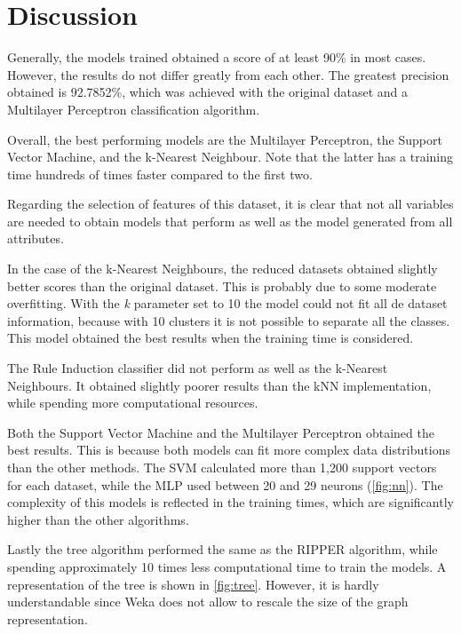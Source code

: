 \documentclass[a4paper,11pt]{article}
\begin{document}
\section{Discussion}
\label{sec:discussion}

Generally, the models trained obtained a score of at least 90\% in most cases. However, the results do not differ greatly from each other. The greatest precision obtained is 92.7852\%, which was achieved with the original dataset and a Multilayer Perceptron classification algorithm.

Overall, the best performing models are the Multilayer Perceptron, the Support Vector Machine, and the k-Nearest Neighbour. Note that the latter has a training time hundreds of times faster compared to the first two.

Regarding the selection of features of this dataset, it is clear that not all variables are needed to obtain models that perform as well as the model generated from all attributes.

In the case of the k-Nearest Neighbours, the reduced datasets obtained slightly better scores than the original dataset. This is probably due to some moderate overfitting. With the \textit{k} parameter set to 10 the model could not fit all de dataset information, because with 10 clusters it is not possible to separate all the classes. This model obtained the best results when the training time is considered.

The Rule Induction classifier did not perform as well as the k-Nearest Neighbours. It obtained slightly poorer results than the kNN implementation, while spending more computational resources.

Both the Support Vector Machine and the Multilayer Perceptron obtained the best results. This is because both models can fit more complex data distributions than the other methods. The SVM calculated more than 1,200 support vectors for each dataset, while the MLP used between 20 and 29 neurons (\autoref{fig:nn}). The complexity of this models is reflected in the training times, which are significantly higher than the other algorithms.


Lastly the tree algorithm performed the same as the RIPPER algorithm, while spending approximately 10 times less computational time to train the models. A representation of the tree is shown in \autoref{fig:tree}. However, it is hardly understandable since Weka does not allow to rescale the size of the graph representation.
\end{document}
